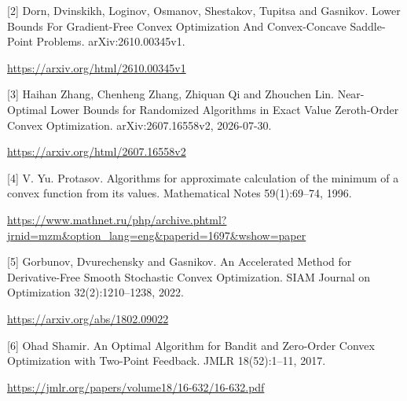 \documentclass[10pt,a4paper]{article}
\begin{document}
[2] Dorn, Dvinskikh, Loginov, Osmanov, Shestakov, Tupitsa and Gasnikov. Lower Bounds For Gradient-Free Convex Optimization And Convex-Concave Saddle-Point Problems. arXiv:2610.00345v1.

\url{https://arxiv.org/html/2610.00345v1}

[3] Haihan Zhang, Chenheng Zhang, Zhiquan Qi and Zhouchen Lin. Near-Optimal Lower Bounds for Randomized Algorithms in Exact Value Zeroth-Order Convex Optimization. arXiv:2607.16558v2, 2026-07-30.

\url{https://arxiv.org/html/2607.16558v2}

[4] V. Yu. Protasov. Algorithms for approximate calculation of the minimum of a convex function from its values. Mathematical Notes 59(1):69--74, 1996.

\url{https://www.mathnet.ru/php/archive.phtml?jrnid=mzm&option_lang=eng&paperid=1697&wshow=paper}

[5] Gorbunov, Dvurechensky and Gasnikov. An Accelerated Method for Derivative-Free Smooth Stochastic Convex Optimization. SIAM Journal on Optimization 32(2):1210--1238, 2022.

\url{https://arxiv.org/abs/1802.09022}

[6] Ohad Shamir. An Optimal Algorithm for Bandit and Zero-Order Convex Optimization with Two-Point Feedback. JMLR 18(52):1--11, 2017.

\url{https://jmlr.org/papers/volume18/16-632/16-632.pdf}
\end{document}
